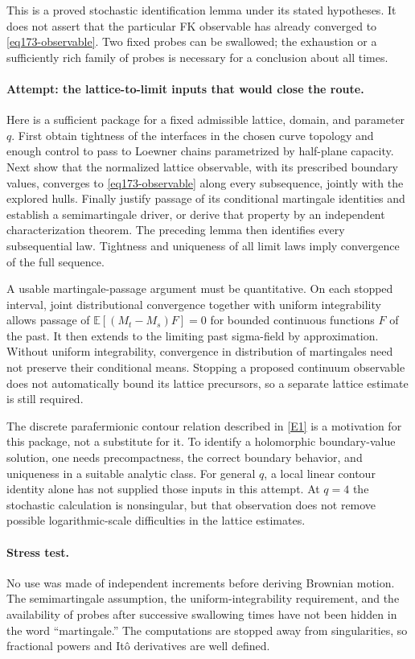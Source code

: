 \documentclass[11pt,a4paper]{article}
\newcommand{\E}{\mathbb{E}}
\newcommand{\eref}[2]{\hyperlink{extra:#1:#2}{[E#2]}}
\numberwithin{equation}{section}
\begin{document}
This is a proved stochastic identification lemma under its stated
hypotheses. It does not assert that the particular FK observable has
already converged to \eqref{eq173-observable}. Two fixed probes can be
swallowed; the exhaustion or a sufficiently rich family of probes is
necessary for a conclusion about all times.

\paragraph{Attempt: the lattice-to-limit inputs that would close the route.}
Here is a sufficient package for a fixed admissible lattice, domain, and
parameter $q$. First obtain tightness of the interfaces in the chosen curve
topology and enough control to pass to Loewner chains parametrized by
half-plane capacity. Next show that the normalized lattice observable,
with its prescribed boundary values, converges to
\eqref{eq173-observable} along every subsequence, jointly with the explored
hulls. Finally justify passage of its conditional martingale identities
and establish a semimartingale driver, or derive that property by an
independent characterization theorem. The preceding lemma then identifies
every subsequential law. Tightness and uniqueness of all limit laws imply
convergence of the full sequence.

A usable martingale-passage argument must be quantitative. On each stopped
interval, joint distributional convergence together with uniform
integrability allows passage of
$\E[(M_t-M_s)F]=0$ for bounded continuous functions $F$ of the past.
It then extends to the limiting past sigma-field by approximation. Without
uniform integrability, convergence in distribution of martingales need
not preserve their conditional means. Stopping a proposed continuum
observable does not automatically bound its lattice precursors, so a
separate lattice estimate is still required.

The discrete parafermionic contour relation described in \eref{173}{1}
is a motivation for this package, not a substitute for it. To identify a
holomorphic boundary-value solution, one needs precompactness, the correct
boundary behavior, and uniqueness in a suitable analytic class. For general
$q$, a local linear contour identity alone has not supplied those inputs
in this attempt. At $q=4$ the stochastic calculation is nonsingular, but
that observation does not remove possible logarithmic-scale difficulties
in the lattice estimates.

\paragraph{Stress test.}
No use was made of independent increments before deriving Brownian motion.
The semimartingale assumption, the uniform-integrability requirement, and
the availability of probes after successive swallowing times have not been
hidden in the word ``martingale.'' The computations are stopped away from
singularities, so fractional powers and It\^o derivatives are well defined.
\end{document}
